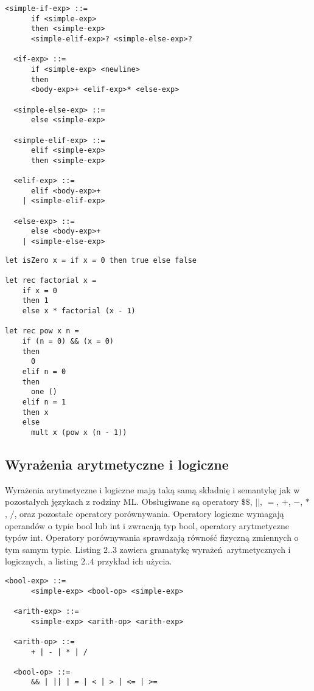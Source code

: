 \documentclass[declaration,shortabstract]{iithesis}
\begin{document}
\begin{lstlisting}[frame=single, caption=Wyrażenia warunkowe.]
  <simple-if-exp> ::= 
      if <simple-exp>  
      then <simple-exp> 
      <simple-elif-exp>? <simple-else-exp>?

  <if-exp> ::= 
      if <simple-exp> <newline>
      then 
      <body-exp>+ <elif-exp>* <else-exp>

  <simple-else-exp> ::=
      else <simple-exp> 

  <simple-elif-exp> ::=
      elif <simple-exp>
      then <simple-exp> 

  <elif-exp> ::=
      elif <body-exp>+ 
    | <simple-elif-exp> 

  <else-exp> ::=
      else <body-exp>+ 
    | <simple-else-exp> 
\end{lstlisting}

\begin{lstlisting}[frame=single, caption=Przykłady wyrażeń warunkowych.]
let isZero x = if x = 0 then true else false

let rec factorial x = 
    if x = 0 
    then 1 
    else x * factorial (x - 1)

let rec pow x n = 
    if (n = 0) && (x = 0)
    then 
      0 
    elif n = 0 
    then 
      one ()
    elif n = 1 
    then x
    else 
      mult x (pow x (n - 1))
\end{lstlisting}

\subsection{Wyrażenia arytmetyczne i logiczne}
Wyrażenia arytmetyczne i logiczne mają taką samą składnię i semantykę
jak w pozostałych językach z rodziny ML. Obsługiwane są operatory $\$\$$, 
$||$, $=$, $+$, $-$, $*$, $/$, oraz pozostałe operatory porównywania. 
Operatory logiczne wymagają operandów o typie 
bool lub int i zwracają typ bool, operatory arytmetyczne typów int. 
Operatory porównywania 
sprawdzają równość fizyczną zmiennych o tym samym typie.
Listing $2..3$ zawiera gramatykę wyrażeń arytmetycznych i logicznych, a 
listing $2..4$ przykład ich użycia. 

\begin{lstlisting}[frame=single, caption=Wyrażenia arytmetyczne i logiczne.]
  <bool-exp> ::=
      <simple-exp> <bool-op> <simple-exp> 
  
  <arith-exp> ::=
      <simple-exp> <arith-op> <arith-exp> 
  
  <arith-op> ::=
      + | - | * | /
  
  <bool-op> ::=
      && | || | = | < | > | <= | >= 
\end{lstlisting}
\end{document}
